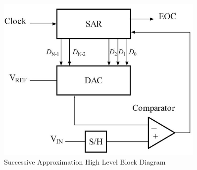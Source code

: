 \documentclass[10pt]{report}
\begin{document}
\begin{figure}[H]
\centering
   \includegraphics[width=0.9\textwidth]{ADC_2}
    \caption{Successive Approximation High Level Block Diagram}
\end{figure}
\end{document}
